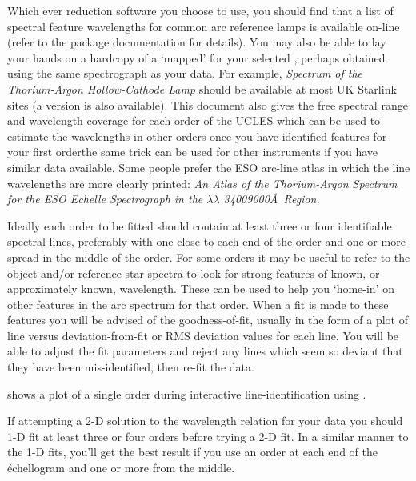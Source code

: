 Which ever reduction software you choose to use, you should find that a
list of spectral feature wavelengths for common arc reference lamps is
available on-line (refer to the package documentation for details).
You may also be able to lay your hands on a hardcopy of a `mapped'
 for your selected
,  perhaps obtained using
the same spectrograph as your data.  For example, {\sl
{} Spectrum
of the Thorium-Argon Hollow-Cathode Lamp} should be available at most UK
Starlink sites (a  version is also available).
This document also gives the free spectral range and wavelength coverage
for each order of the UCLES which can be used to estimate the wavelengths
in other orders once you have identified features for your first
order\sgspec{---}{ - }the same trick can be used
for other instruments if you have similar data available.
Some people prefer the ESO arc-line atlas in which the line wavelengths
are more clearly printed:
{\sl An Atlas of the Thorium-Argon Spectrum for the ESO Echelle
Spectrograph in the $\lambda\lambda$ 3400\sgspec{--}{-}9000\AA\ Region.}

Ideally each order to be fitted should contain at least three or four
identifiable
spectral lines, preferably with one close to each end of the order and one
or more spread in the middle of the order.  For some
orders it may be useful to refer to the object and/or reference star
spectra to look for strong features of known, or approximately known,
wavelength.  These can be used to help you `home-in' on other features
in the arc spectrum for that order.
When a fit is made to these features you will be advised of the
goodness-of-fit, usually in the form of a plot of line versus
deviation-from-fit or RMS deviation values for each line.
You will be able to adjust the fit parameters and reject any lines which
seem so deviant that they have been mis-identified, then re-fit the data.

shows a plot of a single order
during interactive line-identification using .

If attempting a 2-D solution to the wavelength relation for your data
you should 1-D fit at least three or four orders before trying a 2-D fit.
In a similar manner to the 1-D fits, you'll get the best result if you use
an order at each end of the \'{e}chellogram and one or more from the
middle.

